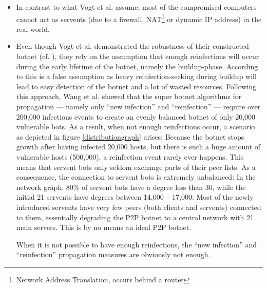 \documentclass{llncs}
\begin{document}
\begin{itemize}
\item \label{nat} In contrast to what Vogt et al. assume, most of the
  compromised computers cannot act as servents (due to a firewall,
  NAT\footnote{Network Address Translation, occurs behind a router}
  or dynamic IP address) in the real world.
\item Even though Vogt et al. demonstrated the robustness of their
  constructed botnet (cf. \cite{vogt2007army}), they rely on the
  assumption that enough reinfections will occur during the early
  lifetime of the botnet, namely the buildup-phase. According to
  \cite{td1sc} this is a false assumption as heavy reinfection-seeking
  during buildup will lead to easy detection of the botnet and a lot
  of wasted resources. Following this approach, Wang et al. showed
  that the super botnet algorithms for propagation --- namely only
  ``new infection'' and ``reinfection'' --- require over 200,000
  infections events to create an evenly balanced botnet of only 20,000
  vulnerable bots. As a result, when not enough reinfections occur, a
  scenario as depicted in figure \ref{distributiongraph} arises:
  Because the botnet stops growth after having infected 20,000 hosts,
  but there is such a huge amount of vulnerable hosts (500,000), a
  reinfection event rarely ever happens. This means that servent bots
  only seldom exchange parts of their peer lists. As a consequence,
  the connection to servent bots is extremely unbalanced: In the
  network graph, 80\% of servent bots have a degree less than 30,
  while the initial 21 servents have degrees between 14,000 -- 17,000:
  Most of the newly introduced servents have very few peers (both
  clients and servents) connected to them, essentially degrading the
  P2P botnet to a central network with 21 main servers. This is by no
  means an ideal P2P botnet.

When it is not possible to have enough reinfections, the ``new
infection'' and ``reinfection'' propagation measures are obviously not
enough.
\end{itemize}
\end{document}
